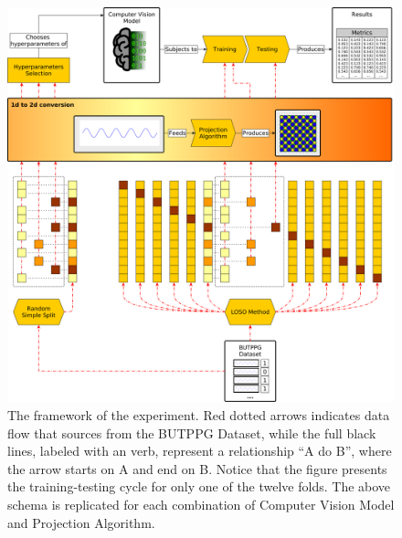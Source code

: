 \begin{figure}
	\includegraphics[width=\textwidth]{img/framework.png}
	\caption{The framework of the experiment. Red dotted arrows indicates data flow that sources from the  BUTPPG Dataset, while the full black lines, labeled with an verb, represent a relationship ``A do B'', where the arrow starts on A and end on B. Notice that the figure presents the training-testing cycle for only one of the twelve folds. The above schema is replicated for each combination of  Computer Vision Model and Projection Algorithm.}
	\label{fig:framework}
\end{figure}
